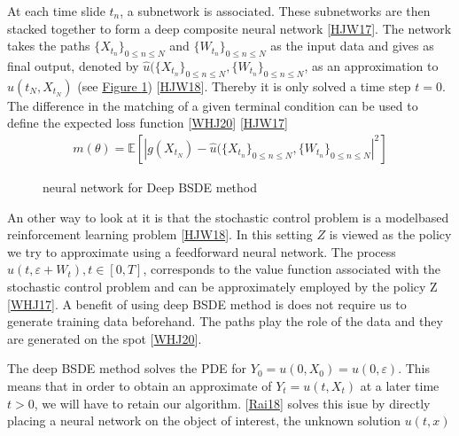 \documentclass[letterpaper,10pt,english]{jupyterBook}
\let\sphinxpxdimen\pdfpxdimen\else\newdimen\sphinxpxdimen
\begin{document}
\sphinxAtStartPar
At each time slide \(t_n\), a subnetwork is associated. These subnetworks are then stacked together to form a deep composite neural network {[}\hyperlink{cite.Discussion:id27}{HJW17}{]}. The network takes the paths  \(\{X_{t_n}\}_{0\leq n \leq N}\) and \(\{W_{t_n}\}_{0\leq n \leq N}\) as the input data and gives as final output, denoted by \(\hat{u}(\{ X_{t_n}\}_{0 \leq n \leq N}, \{W_{t_n}\}_{0 \leq n \leq N}\),  as an approximation to \(u(t_N, X_{t_N})\) (see \hyperref[\detokenize{Financial_application:bsdn-fig}]{Figure \ref{\detokenize{Financial_application:bsdn-fig}}}) {[}\hyperlink{cite.Discussion:id30}{HJW18}{]}. Thereby it is only solved a time step \(t=0\). The difference in the matching of a given terminal condition can be used to define the expected loss function {[}\hyperlink{cite.Discussion:id28}{WHJ20}{]} {[}\hyperlink{cite.Discussion:id27}{HJW17}{]}
\begin{equation*}
\begin{split} m(\theta) = \mathbb{E}[|g(X_{t_N}) - \hat{u}(\{ X_{t_n}\}_{0 \leq n \leq N}, \{W_{t_n}\}_{0 \leq n \leq N} |^2]\end{split}
\end{equation*}
\begin{figure}[htbp]
\centering
\capstart

\noindent\sphinxincludegraphics[width=500\sphinxpxdimen,height=300\sphinxpxdimen]{{BSDE_NN}.png}
\caption{neural network for Deep BSDE method}\label{\detokenize{Financial_application:bsdn-fig}}\end{figure}

\sphinxAtStartPar
An other way to look at it is that the stochastic control problem is a model\sphinxhyphen{}based reinforcement learning problem {[}\hyperlink{cite.Discussion:id30}{HJW18}{]}. In this setting \(Z\) is viewed as the policy we try to approximate using a feedforward neural network. The process \(u(t, \varepsilon + W_t), t \in [0, T]\), corresponds to the value function associated with the stochastic control problem and can be approximately employed by the policy Z {[}\hyperlink{cite.Discussion:id29}{WHJ17}{]}. A benefit of using deep BSDE method is does not require us to generate training data beforehand. The paths play the role of the data and they are generated on the spot {[}\hyperlink{cite.Discussion:id28}{WHJ20}{]}.

\sphinxAtStartPar
The deep BSDE method solves the PDE for \(Y_0= u(0, X_0) = u(0, \varepsilon)\). This means that in order to obtain an approximate of \(Y_t = u(t,X_t)\) at a later time \(t>0\), we will have to retain our algorithm. {[}\hyperlink{cite.Discussion:id26}{Rai18}{]} solves this isue by directly placing a neural network on the object of interest, the unknown solution \(u(t,x)\)
\end{document}
